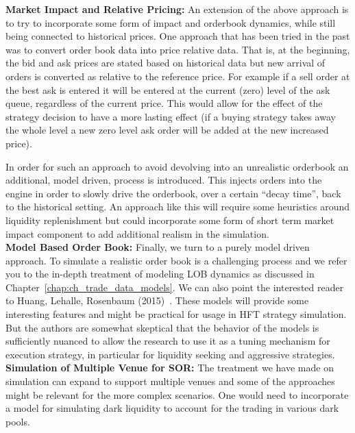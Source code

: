 \noindent\textbf{Market Impact and Relative Pricing:} An extension of the above approach is to try to incorporate some form of impact and orderbook dynamics, while still being connected to historical prices. One approach that has been tried in the past was to convert order book data into price relative data. That is, at the beginning, the bid and ask prices are stated based on historical data but new arrival of orders is converted as relative to the reference price. For example if a sell order at the best ask is entered it will be entered at the current (zero) level of the ask queue, regardless of the current price. This would allow for the effect of the strategy decision to have a more lasting effect (if a buying strategy takes away the whole level a new zero level ask order will be added at the new increased price). 


In order for such an approach to avoid devolving into an unrealistic orderbook an additional, model driven, process is introduced. This injects orders into the engine in order to slowly drive the orderbook, over a certain ``decay time'', back to the historical setting. An approach like this will require some heuristics around liquidity replenishment but could incorporate some form of short term market impact component to add additional realism in the simulation. \\


\noindent\textbf{Model Based Order Book:} Finally, we turn to a purely model driven approach. To simulate a realistic order book is a challenging process and we refer you to the in-depth treatment of modeling LOB dynamics as discussed in Chapter~\ref{chap:ch_trade_data_models}. We can also point the interested reader to Huang, Lehalle, Rosenbaum (2015)~\cite{hulero}. These models will provide some interesting features and might be practical for usage in HFT strategy simulation. But the authors are somewhat skeptical that the behavior of the models is sufficiently nuanced to allow the research to use it as a tuning mechanism for execution strategy, in particular for liquidity seeking and aggressive strategies. \\


\noindent\textbf{Simulation of Multiple Venue for SOR:} The treatment we have made on simulation can expand to support multiple venues and some of the approaches might be relevant for the more complex scenarios. One would need to incorporate a model for simulating dark liquidity to account for the trading in various dark pools. \\ 


